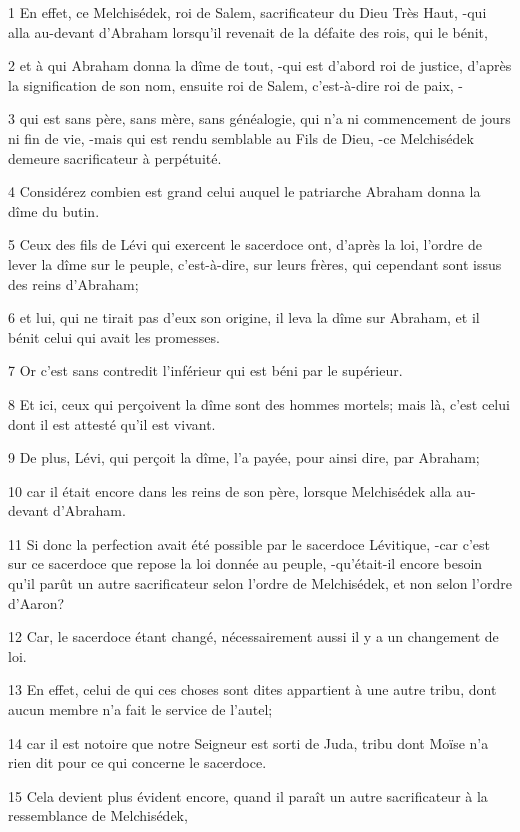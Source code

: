 \par 1 En effet, ce Melchisédek, roi de Salem, sacrificateur du Dieu Très Haut, -qui alla au-devant d'Abraham lorsqu'il revenait de la défaite des rois, qui le bénit,
\par 2 et à qui Abraham donna la dîme de tout, -qui est d'abord roi de justice, d'après la signification de son nom, ensuite roi de Salem, c'est-à-dire roi de paix, -
\par 3 qui est sans père, sans mère, sans généalogie, qui n'a ni commencement de jours ni fin de vie, -mais qui est rendu semblable au Fils de Dieu, -ce Melchisédek demeure sacrificateur à perpétuité.
\par 4 Considérez combien est grand celui auquel le patriarche Abraham donna la dîme du butin.
\par 5 Ceux des fils de Lévi qui exercent le sacerdoce ont, d'après la loi, l'ordre de lever la dîme sur le peuple, c'est-à-dire, sur leurs frères, qui cependant sont issus des reins d'Abraham;
\par 6 et lui, qui ne tirait pas d'eux son origine, il leva la dîme sur Abraham, et il bénit celui qui avait les promesses.
\par 7 Or c'est sans contredit l'inférieur qui est béni par le supérieur.
\par 8 Et ici, ceux qui perçoivent la dîme sont des hommes mortels; mais là, c'est celui dont il est attesté qu'il est vivant.
\par 9 De plus, Lévi, qui perçoit la dîme, l'a payée, pour ainsi dire, par Abraham;
\par 10 car il était encore dans les reins de son père, lorsque Melchisédek alla au-devant d'Abraham.
\par 11 Si donc la perfection avait été possible par le sacerdoce Lévitique, -car c'est sur ce sacerdoce que repose la loi donnée au peuple, -qu'était-il encore besoin qu'il parût un autre sacrificateur selon l'ordre de Melchisédek, et non selon l'ordre d'Aaron?
\par 12 Car, le sacerdoce étant changé, nécessairement aussi il y a un changement de loi.
\par 13 En effet, celui de qui ces choses sont dites appartient à une autre tribu, dont aucun membre n'a fait le service de l'autel;
\par 14 car il est notoire que notre Seigneur est sorti de Juda, tribu dont Moïse n'a rien dit pour ce qui concerne le sacerdoce.
\par 15 Cela devient plus évident encore, quand il paraît un autre sacrificateur à la ressemblance de Melchisédek,
